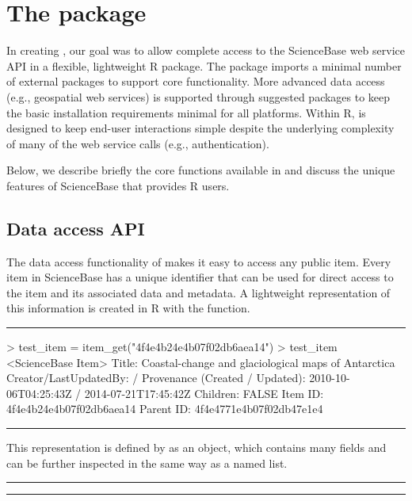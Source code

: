 
\section{The  package}

In creating , our goal was to allow complete
access to the ScienceBase web service API in a flexible, lightweight
R package. The package imports a minimal number of external packages
to support core functionality. More advanced data access (e.g., geospatial
web services) is supported through suggested packages to keep the basic
installation requirements minimal for all platforms. Within R, 
is designed to keep end-user interactions simple despite the underlying 
complexity of many of the web service calls (e.g., authentication).

Below, we describe briefly the core functions available in 
and discuss the unique features of ScienceBase that 
provides R users.


\subsection{Data access API}
The data access functionality of  makes it easy to
access any public item. Every item in ScienceBase has a unique identifier
that can be used for direct access to the item and its associated data and
metadata. A lightweight representation of this information is created in R
with the  function.

\noindent\rule{\textwidth}{0.4pt}
\begin{example}
> test_item = item_get("4f4e4b24e4b07f02db6aea14")
> test_item
<ScienceBase Item>
  Title: Coastal-change and glaciological maps of Antarctica
  Creator/LastUpdatedBy:      /
  Provenance (Created / Updated):  2010-10-06T04:25:43Z / 2014-07-21T17:45:42Z
  Children: FALSE
  Item ID: 4f4e4b24e4b07f02db6aea14
  Parent ID: 4f4e4771e4b07f02db47e1e4
\end{example}
\noindent\rule{\textwidth}{0.4pt}

This representation is defined by  as an  object,
which contains many fields and can be further inspected in the same
way as a named list.

\noindent\rule{\textwidth}{0.4pt}
\noindent\rule{\textwidth}{0.4pt}

